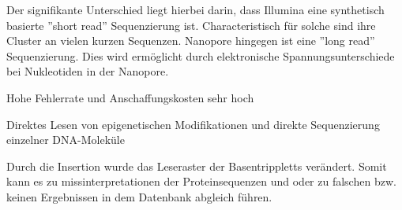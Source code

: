 \begin{mechanism}[title=Unterschied Illumina vs. Nanopore]
Der signifikante Unterschied liegt hierbei darin, dass Illumina eine synthetisch
basierte ”short read” Sequenzierung ist. Characteristisch für solche sind ihre
Cluster an vielen kurzen Sequenzen.
Nanopore hingegen ist eine ”long read” Sequenzierung. Dies wird ermöglicht
durch elektronische Spannungsunterschiede bei Nukleotiden in der Nanopore.
\end{mechanism}

\begin{mechanism}[title=Was sind die Nachteile von Oxford Nanopore?]
Hohe Fehlerrate und Anschaffungskosten sehr hoch
\end{mechanism}
\begin{mechanism}[title=Was sind die Vorteile langer Reads?]
Direktes Lesen von epigenetischen Modifikationen und direkte Sequenzierung einzelner DNA-Moleküle
\end{mechanism}

\begin{mechanism}[title=Durch einen Sequenzierfehler wurde eine zusätzliche Base in die Sequenz eingebaut. Welche späteren Folgen kann dies haben?]
Durch die Insertion wurde das Leseraster der Basentrippletts verändert. Somit kann es zu missinterpretationen der Proteinsequenzen und oder zu falschen bzw. keinen Ergebnissen in dem Datenbank abgleich führen.
\end{mechanism}
